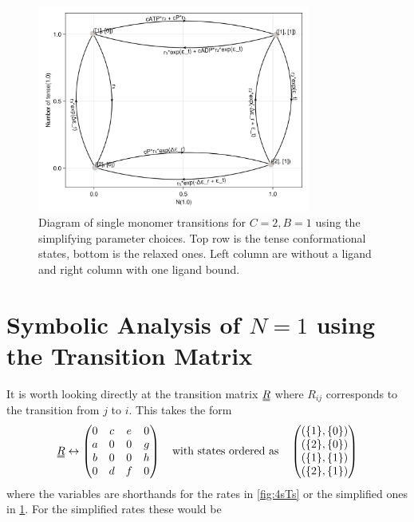 \documentclass[11pt]{article}
\newcommand\set[1]{\ensuremath{\{#1\}}}
\newcommand{\duf}[2]{\stackunder[0.5pt]{\stackunder[0.8pt]{\stackunder[1pt]{\ensuremath{#1}}{\rule{\widthof{\ensuremath{#2}}*\real{0.9}}{.1ex}}}{\rule{\widthof{\ensuremath{#2}}*\real{0.9}}{.1ex}}}{}}
\newcommand{\du}[1]{\duf{#1}{#1}}
\begin{document}
\begin{figure}[H]
    \centering
    \includegraphics[width=0.8\textwidth]{../../plots/simple_sg_B=1_C=2_N=1_version=2.5.png}
    \caption{
        Diagram of single monomer transitions for $C=2,B=1$ using the simplifying parameter choices.
        Top row is the tense conformational states, bottom is the relaxed ones.
        Left column are without a ligand and right column with one ligand bound.
    }\label{fig:4sTss}
\end{figure}

\newpage
\section{Symbolic Analysis of $N=1$ using the Transition Matrix}
It is worth looking directly at the transition matrix $\du{R}$ where $R_{ij}$ corresponds to the transition from $j$ to $i$.
This takes the form
\begin{align}
    \du{R} \leftrightarrow \begin{pmatrix}
    0 & c & e & 0 \\
    a & 0 & 0 & g \\
    b & 0 & 0 & h \\
    0 & d & f & 0 \\
    \end{pmatrix} \qq{with states ordered as} \begin{pmatrix}
        (\set{1}, \set{0}) \\
        (\set{2}, \set{0}) \\
        (\set{1}, \set{1}) \\
        (\set{2}, \set{1})
    \end{pmatrix}
\end{align}
where the variables are shorthands for the rates in \cref{fig:4sTs} or the simplified ones in \cref{fig:4sTss}.
For the simplified rates these would be
\end{document}
